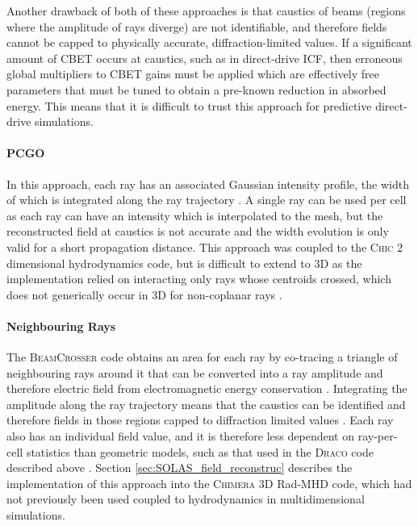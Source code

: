 Another drawback of both of these approaches is that caustics of beams (regions where the amplitude of rays diverge) are not identifiable, and therefore fields cannot be capped to physically accurate, diffraction-limited values.
If a significant amount of \ac{CBET} occurs at caustics, such as in direct-drive \ac{ICF}, then erroneous global multipliers to \ac{CBET} gains must be applied which are effectively free parameters that must be tuned to obtain a pre-known reduction in absorbed energy.
This means that it is difficult to trust this approach for predictive direct-drive simulations.

\paragraph*{\ac{PCGO}} In this approach, each ray has an associated Gaussian intensity profile, the width of which is integrated along the ray trajectory \cite{colaitis_towards_2014,colaitis_crossed_2016}.
A single ray can be used per cell as each ray can have an intensity which is interpolated to the mesh, but the reconstructed field at caustics is not accurate and the width evolution is only valid for a short propagation distance.
This approach was coupled to the \textsc{Chic} 2 dimensional hydrodynamics code, but is difficult to extend to 3D as the implementation relied on interacting only rays whose centroids crossed, which does not generically occur in 3D for non-coplanar rays \cite{colaitis_modeling_2015}.

\paragraph*{Neighbouring Rays} The \textsc{BeamCrosser} code obtains an area for each ray by co-tracing a triangle of neighbouring rays around it that can be converted into a ray amplitude and therefore electric field from electromagnetic energy conservation \cite{edgell_mitigation_2017}.
Integrating the amplitude along the ray trajectory means that the caustics can be identified and therefore fields in those regions capped to diffraction limited values \cite{follett_ray-based_2018}.
Each ray also has an individual field value, and it is therefore less dependent on ray-per-cell statistics than geometric models, such as that used in the \textsc{Draco} code described above \cite{follett_validation_2022}.
Section \ref{sec:SOLAS_field_reconstruc} describes the implementation of this approach into the \textsc{Chimera} 3D \ac{Rad-MHD} code, which had not previously been used coupled to hydrodynamics in multidimensional simulations.



